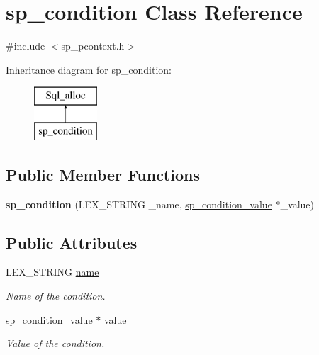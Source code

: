 \hypertarget{classsp__condition}{}\section{sp\+\_\+condition Class Reference}
\label{classsp__condition}


{\ttfamily \#include $<$sp\+\_\+pcontext.\+h$>$}

Inheritance diagram for sp\+\_\+condition\+:\begin{figure}[H]
\begin{center}
\leavevmode
\includegraphics[height=2.000000cm]{classsp__condition}
\end{center}
\end{figure}
\subsection*{Public Member Functions}
\begin{DoxyCompactItemize}
\item 
\mbox{\label{classsp__condition_a5cab8b6c5896eb0a7d315c78a88279ad}} 
{\bfseries sp\+\_\+condition} (L\+E\+X\+\_\+\+S\+T\+R\+I\+NG \+\_\+name, \mbox{\hyperlink{classsp__condition__value}{sp\+\_\+condition\+\_\+value}} $\ast$\+\_\+value)
\end{DoxyCompactItemize}
\subsection*{Public Attributes}
\begin{DoxyCompactItemize}
\item 
\mbox{\label{classsp__condition_a861c3cbd66c03c109ff5a5e9e30158b5}} 
L\+E\+X\+\_\+\+S\+T\+R\+I\+NG \mbox{\hyperlink{classsp__condition_a861c3cbd66c03c109ff5a5e9e30158b5}{name}}
\begin{DoxyCompactList}\small\item\em Name of the condition. \end{DoxyCompactList}\item 
\mbox{\label{classsp__condition_a0ab7438ef9ba76b7514b4bc48b229431}} 
\mbox{\hyperlink{classsp__condition__value}{sp\+\_\+condition\+\_\+value}} $\ast$ \mbox{\hyperlink{classsp__condition_a0ab7438ef9ba76b7514b4bc48b229431}{value}}
\begin{DoxyCompactList}\small\item\em Value of the condition. \end{DoxyCompactList}\end{DoxyCompactItemize}
